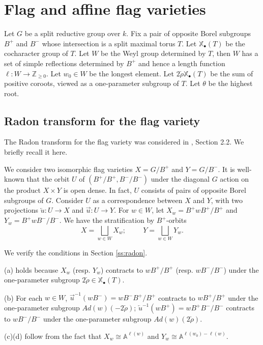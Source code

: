 \documentclass{amsart}
\theoremstyle{plain}
\theoremstyle{definition}
\theoremstyle{remark}
\numberwithin{equation}{subsection}
\begin{document}
\section{Flag and affine flag varieties}\label{s:ex}

Let $G$ be a split reductive group over $k$. Fix a pair of opposite Borel subgroups $B^+$ and $B^-$ whose intersection is a split maximal torus $T$. Let ${\mathbb{X}_\bullet}(T)$ be the cocharacter group of $T$. Let $W$ be the Weyl group determined by $T$, then $W$ has a set of simple reflections determined by $B^+$ and hence a length function $\ell:W\to{\mathbb{Z}}_{\geq0}$. Let $w_0\in W$ be the longest element. Let $2\check{\rho}{\mathbb{X}_\bullet}(T)$ be the sum of positive coroots, viewed as a one-parameter subgroup of $T$. Let $\theta$ be the highest root.

\subsection{Radon transform for the flag variety}
The Radon transform for the flag variety was considered in \cite{BBM}, Section 2.2. We briefly recall it here. 

We consider two isomorphic flag varieties $X=G/B^+$ and $Y=G/B^-$. It is well-known that the orbit $U$ of $(B^+/B^+,B^-/B^-)$ under the diagonal $G$ action on the product $X\times Y$ is open dense. In fact, $U$ consists of pairs of opposite Borel subgroups of $G$. Consider $U$ as a correspondence between $X$ and $Y$, with two projections $\overleftarrow{u}:U\to X$ and $\overrightarrow{u}:U\to Y$. For $w\in W$, let $X_w=B^+wB^+/B^+$ and $Y_w=B^+wB^-/B^-$. We have the stratification by $B^+$-orbits
\begin{equation*}
X=\bigsqcup_{w\in W}X_w;\hspace{1cm}Y=\bigsqcup_{w\in W}Y_w.
\end{equation*}

We verify the conditions in Section \ref{ss:radon}.

(a) holds because $X_w$ (resp. $Y_w$) contracts to $wB^+/B^+$ (resp. $wB^-/B^-$) under the one-parameter subgroup $2\check{\rho}\in{\mathbb{X}_\bullet}(T)$.

(b) For each $w\in W$, $\overrightarrow{u}^{-1}(wB^-)=wB^-B^+/B^+$ contracts to $wB^+/B^+$ under the one-parameter subgroup $Ad(w)(-2\check{\rho})$; $\overleftarrow{u}^{-1}(wB^+)=wB^+B^-/B^-$ contracts to $wB^-/B^-$ under the one-parameter subgroup $Ad(w)(2\check{\rho})$.

(c)(d) follow from the fact that $X_w\cong{\mathbb{A}}^{\ell(w)}$ and $Y_w\cong{\mathbb{A}}^{\ell(w_0)-\ell(w)}$.
\end{document}
